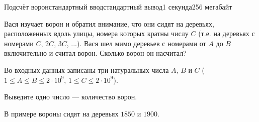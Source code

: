 \begin{problem}{Подсчёт ворон}{стандартный ввод}{стандартный вывод}{1 секунда}{256 мегабайт}

Вася изучает ворон и обратил внимание, что они сидят на деревьях, расположенных вдоль улицы, номера которых кратны числу $C$ (т.е. на деревьях с номерами $C$, $2C$, $3C$, ...). Вася шел мимо деревьев с номерами от $A$ до $B$ включительно и считал ворон. Сколько ворон он насчитал?

\InputFile
Во входных данных записаны три натуральных числа $A$, $B$ и $C$ ($1 \le A \le B \le 2 \cdot 10^9$, $1 \le C \le 2 \cdot 10^9$).

\OutputFile
Выведите одно число --- количество ворон.

\Example

\begin{example}
%
\end{example}

\Note
В примере вороны сидят на деревьях $1850$ и $1900$.

\end{problem}

